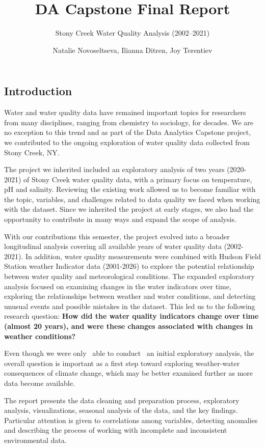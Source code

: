 \documentclass[
  letterpaper,
  DIV=11,
  numbers=noendperiod]{scrartcl}
\title{DA Capstone Final Report}
\subtitle{Stony Creek Water Quality Analysis (2002--2021)}
\author{Natalie Novoseltseva, Ilianna Ditren, Joy Terentiev}
\date{}
\begin{document}
\maketitle


\subsection{Introduction}\label{introduction}

Water and water quality data have remained important topics for
researchers from many disciplines, ranging from chemistry to sociology,
for decades. We are no exception to this trend and as part of the Data
Analytics Capstone project, we contributed to the ongoing exploration of
water quality data collected from Stony Creek, NY.~

The project we inherited included an exploratory analysis of two years
(2020-2021) of Stony Creek water quality data, with a primary focus on
temperature, pH and salinity. Reviewing the existing work allowed us to
become familiar with the topic, variables, and challenges related to
data quality we faced when working with the dataset. Since we inherited
the project at early stages, we also had the opportunity to contribute
in many ways and expand the scope of analysis.

With our contributions this semester, the project evolved into a broader
longitudinal analysis covering all available years of water quality data
(2002-2021). In addition, water quality measurements were combined with
Hudson Field Station weather Indicator data (2001-2026) to explore the
potential relationship between water quality and meteorological
conditions. The expanded exploratory analysis focused on examining
changes in the water indicators over time, exploring the relationships
between weather and water conditions, and detecting unusual events and
possible mistakes in the dataset. This led us to the following research
question: \textbf{How did the water quality indicators change over time
(almost 20 years), and were these changes associated with changes in
weather conditions?}

Even though we were only~ able to conduct~ an initial exploratory
analysis, the overall question is important as a first step toward
exploring weather-water consequences of climate change, which may be
better examined further as more data become available.

The report presents the data cleaning and preparation process,
exploratory analysis, visualizations, seasonal analysis of the data, and
the key findings. Particular attention is given to correlations among
variables, detecting anomalies and describing the process of working
with incomplete and inconsistent environmental data.
\end{document}
